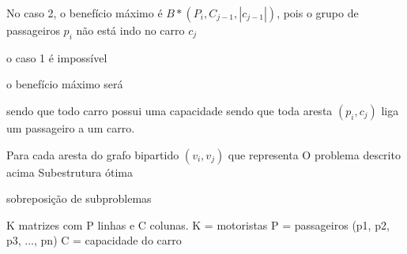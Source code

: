 \documentclass{article}
\begin{document}
No caso 2, o benefício máximo é $ B*(P_{i}, C_{j-1}, |c_{j-1}|) $, pois o grupo de passageiros $ p_i $ não 
está indo no carro $ c_j $

o caso 1 é impossível

o benefício máximo será 

sendo que todo carro possui uma capacidade
sendo que toda aresta $ (p_i, c_j) $ liga um passageiro a um carro. 


Para cada aresta do grafo bipartido $ (v_i, v_j) $ que representa
O problema descrito acima Subestrutura ótima


sobreposição de subproblemas

K matrizes com P linhas e C colunas.
K = motoristas
P = passageiros (p1, p2, p3, ..., pn)
C = capacidade do carro
\end{document}

